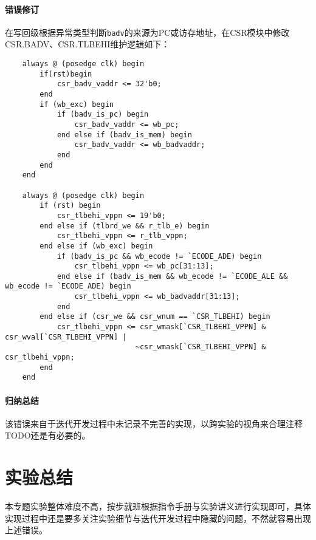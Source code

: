 \documentclass[UTF-8,twoside,c5size]{ctexart}
\begin{document}
    \paragraph{错误修订}\hfill
    
    在写回级根据异常类型判断\texttt{badv}的来源为PC或访存地址，在CSR模块中修改CSR.BADV、CSR.TLBEHI维护逻辑如下：
    \begin{verbatim}
    always @ (posedge clk) begin
        if(rst)begin
            csr_badv_vaddr <= 32'b0;
        end
        if (wb_exc) begin
            if (badv_is_pc) begin
                csr_badv_vaddr <= wb_pc;
            end else if (badv_is_mem) begin
                csr_badv_vaddr <= wb_badvaddr;
            end
        end
    end
    
    always @ (posedge clk) begin
        if (rst) begin
            csr_tlbehi_vppn <= 19'b0;
        end else if (tlbrd_we && r_tlb_e) begin
            csr_tlbehi_vppn <= r_tlb_vppn;
        end else if (wb_exc) begin
            if (badv_is_pc && wb_ecode != `ECODE_ADE) begin
                csr_tlbehi_vppn <= wb_pc[31:13];
            end else if (badv_is_mem && wb_ecode != `ECODE_ALE && wb_ecode != `ECODE_ADE) begin
                csr_tlbehi_vppn <= wb_badvaddr[31:13];
            end
        end else if (csr_we && csr_wnum == `CSR_TLBEHI) begin
            csr_tlbehi_vppn <= csr_wmask[`CSR_TLBEHI_VPPN] & csr_wval[`CSR_TLBEHI_VPPN] |
                              ~csr_wmask[`CSR_TLBEHI_VPPN] & csr_tlbehi_vppn;
        end
    end
    \end{verbatim}
    
    \paragraph{归纳总结}\hfill
    
    该错误来自于迭代开发过程中未记录不完善的实现，以跨实验的视角来合理注释TODO还是有必要的。
	
	\section{实验总结}
	
	本专题实验整体难度不高，按步就班根据指令手册与实验讲义进行实现即可，具体实现过程中还是要多关注实验细节与迭代开发过程中隐藏的问题，不然就容易出现上述错误。
	
\end{document}
